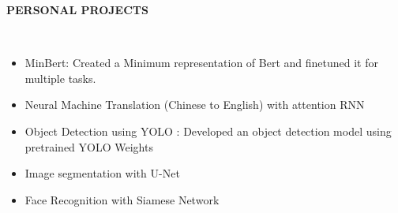 \documentclass[a4paper,10pt]{article}
\newcommand{\lsep}{-0.5cm}
\newcommand{\resheading}[1]{{\small \colorbox{mygrey}{\begin{minipage}{0.975\textwidth}{\textbf{#1 \vphantom{p\^{E}}}}\end{minipage}}}}
\begin{document}
\resheading{\textbf{PERSONAL PROJECTS} }\\[\lsep]
\begin{itemize}
\setlength\itemsep{0.2em}
\item MinBert: Created a Minimum representation of Bert and finetuned it for multiple tasks. %
\item Neural Machine Translation (Chinese to English) with attention RNN%

\item Object Detection using YOLO : Developed an object detection model using pretrained YOLO Weights
\item Image segmentation with U-Net 
\item Face Recognition with Siamese Network

\end{itemize}
\end{document}
